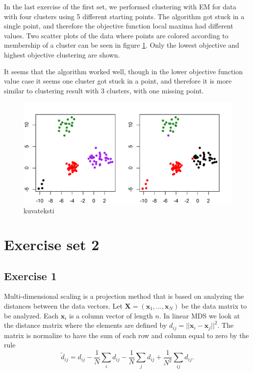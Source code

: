 \documentclass{article}
\renewcommand\vec[1]{\ensuremath{\mathbf{#1}}}
\begin{document}
In the last exercise of the first set, we performed clustering with EM
for data with four clusters using 5 different starting points. The
algorithm got stuck in a single point, and therefore the objective
function local maxima had different values. Two scatter plots of the data
where points are colored according to membership of a cluster can be
seen in figure \ref{fig:4cluster}. Only the lowest objective and
highest objective clustering are shown.

It seems that the algorithm worked well, though in the lower objective
function value case it seems one cluster got stuck in a point, and
therefore it is more similar to clustering result with 3 clusters,
with one missing point.

\begin{figure}[h!]
	\includegraphics[width=\columnwidth]{4cluster.pdf}
	\caption{kuvateksti}\label{fig:4cluster}
\end{figure}



\section{Exercise set 2}
\subsection{Exercise 1}\label{sec:ex21}
Multi-dimensional scaling is a projection method that is based on analyzing the distances between the data vectors.
Let $\vec X=(\vec x_1,\dots,\vec x_N)$ be the data matrix to be analyzed.
Each $\vec x_i$ is a column vector of length $n$.
In linear MDS we look at the distance matrix where the elements are defined by $d_{ij}=||\vec x_i-\vec x_j||^2$.
The matrix is normalize to have the sum of each row and column equal to zero by the rule
$$ \tilde{d}_{ij} = d_{ij} - \frac{1}{N}\sum_id_{ij} - \frac{1}{N}\sum_jd_{ij} + \frac{1}{N^2}\sum_{ij}d_{ij}. $$
\end{document}
